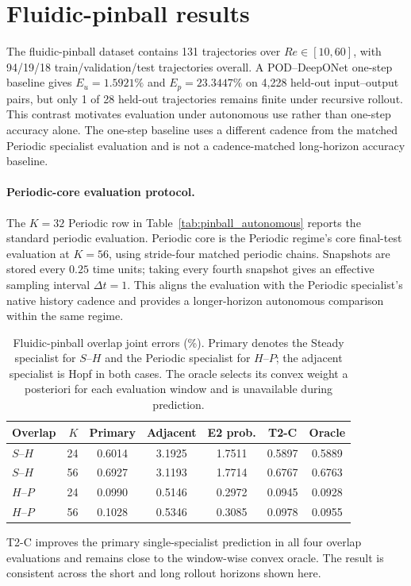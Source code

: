 \section{Fluidic-pinball results}
\label{app:pinball}

The fluidic-pinball dataset contains 131 trajectories over $Re\in[10,60]$, with 94/19/18 train/validation/test trajectories overall. A POD--DeepONet one-step baseline gives $E_u=1.5921\%$ and $E_p=23.3447\%$ on 4,228 held-out input--output pairs, but only 1 of 28 held-out trajectories remains finite under recursive rollout. This contrast motivates evaluation under autonomous use rather than one-step accuracy alone. The one-step baseline uses a different cadence from the matched Periodic specialist evaluation and is not a cadence-matched long-horizon accuracy baseline.

\paragraph{Periodic-core evaluation protocol.}
The $K=32$ Periodic row in Table~\ref{tab:pinball_autonomous} reports the
standard periodic evaluation. Periodic core is the Periodic regime's core
final-test evaluation at $K=56$, using stride-four matched periodic chains.
Snapshots are stored every $0.25$ time units; taking every fourth snapshot
gives an effective sampling interval $\Delta t=1$. This aligns the evaluation
with the Periodic specialist's native history cadence and provides a
longer-horizon autonomous comparison within the same regime.

\begin{table}[h]
\centering
\caption{Fluidic-pinball overlap joint errors (\%). Primary denotes the Steady
specialist for $S$--$H$ and the Periodic specialist for $H$--$P$; the adjacent
specialist is Hopf in both cases. The oracle selects its convex weight a
posteriori for each evaluation window and is unavailable during prediction.}
\label{tab:pinball_overlap}
\small
\setlength{\tabcolsep}{3.5pt}
\begin{tabular}{lrccccc}
\toprule
Overlap & $K$ & Primary & Adjacent & E2 prob. & T2-C & Oracle \\
\midrule
$S$--$H$ & 24 & 0.6014 & 3.1925 & 1.7511 & 0.5897 & 0.5889 \\
$S$--$H$ & 56 & 0.6927 & 3.1193 & 1.7714 & 0.6767 & 0.6763 \\
$H$--$P$ & 24 & 0.0990 & 0.5146 & 0.2972 & 0.0945 & 0.0928 \\
$H$--$P$ & 56 & 0.1028 & 0.5346 & 0.3085 & 0.0978 & 0.0955 \\
\bottomrule
\end{tabular}
\end{table}

T2-C improves the primary single-specialist prediction in all four overlap evaluations and remains close to the window-wise convex oracle. The result is consistent across the short and long rollout horizons shown here.
